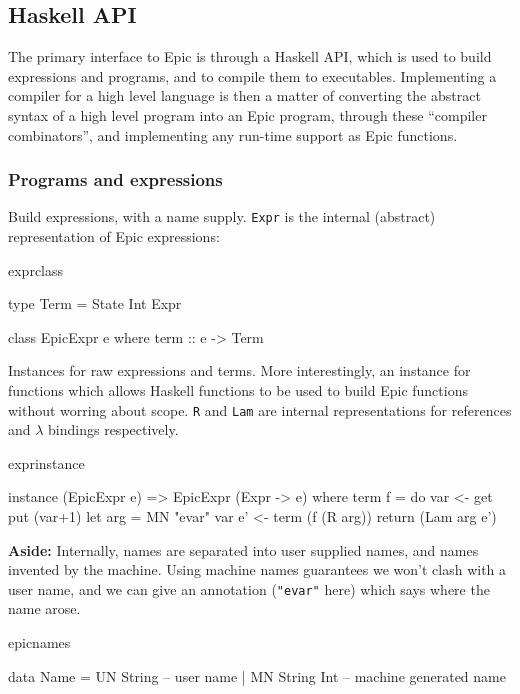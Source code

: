 \subsection{Haskell API}

The primary interface to Epic is through a Haskell API, which is used
to build expressions and programs, and to compile them to executables.
Implementing a compiler for a high level language is then a matter of
converting the abstract syntax of a high level program into an Epic
program, through these ``compiler combinators'', and implementing any
run-time support as Epic functions.

\subsubsection*{Programs and expressions}

Build expressions, with a name supply. \texttt{Expr} is the internal
(abstract) representation of Epic expressions:

\begin{SaveVerbatim}{exprclass}

type Term = State Int Expr

class EpicExpr e where
    term :: e -> Term

\end{SaveVerbatim}

Instances for raw expressions and terms. More interestingly, an
instance for functions which allows Haskell functions to be used to
build Epic functions without worring about scope. \texttt{R} and
\texttt{Lam} are internal representations for references and $\lambda$
bindings respectively.

\begin{SaveVerbatim}{exprinstance}

instance (EpicExpr e) => EpicExpr (Expr -> e) where
    term f = do var <- get
                put (var+1)
                let arg = MN "evar" var
                e' <- term (f (R arg))
                return (Lam arg e')

\end{SaveVerbatim}

\noindent
\textbf{Aside:}
Internally, names are separated into user supplied names, and names
invented by the machine. Using machine names guarantees we won't clash
with a user name, and we can give an annotation (\texttt{"evar"} here)
which says where the name arose.

\begin{SaveVerbatim}{epicnames}

data Name = UN String     -- user name
          | MN String Int -- machine generated name

\end{SaveVerbatim}


